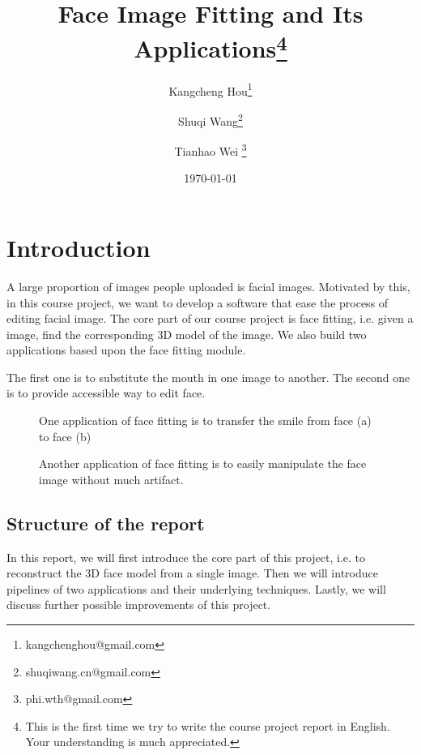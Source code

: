 \documentclass{article}
\title{Face Image Fitting and Its Applications\footnote{This is the first time we try to write the course project report in English. Your understanding is much appreciated.}}
\author{Kangcheng Hou\footnote{kangchenghou@gmail.com} \and Shuqi Wang\footnote{shuqiwang.cn@gmail.com} \and Tianhao Wei \footnote{phi.wth@gmail.com}}
\date{\today}
\begin{document}
\maketitle
\tableofcontents

\section{Introduction}
A large proportion of images people uploaded is facial images. Motivated by this, in this course project, we want to develop a software that ease the process of editing facial image. The core part of our course project is face fitting, i.e. given a image, find the corresponding 3D model of the image. We also build two applications based upon the face fitting module.

The first one is to substitute the mouth in one image to another. The second one is to provide accessible way to edit face.
\begin{figure}
    \centering
    \hfill
    \caption{One application of face fitting is to transfer the smile from face (a) to face (b)}
\end{figure}
\begin{figure}
    \centering
    \hfill
    \caption{Another application of face fitting is to easily manipulate the face image without much artifact.}
\end{figure}

\subsection{Structure of the report}
In this report, we will first introduce the core part of this project, i.e. to reconstruct the 3D face model from a single image. Then we will introduce pipelines of two applications and their underlying techniques. Lastly, we will discuss further possible improvements of this project.
     







 
\end{document}
